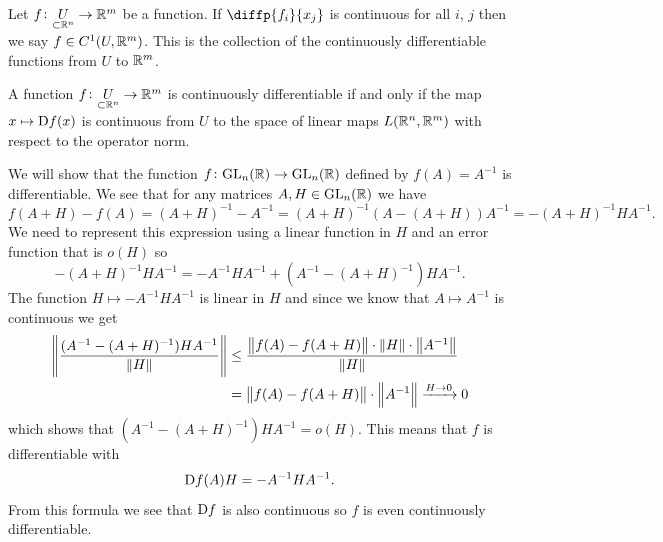 \documentclass[11pt,a4paper]{article}
\begin{document}
\begin{remark}
  Let $f \colon \underset{\subset \mathbb{R}^n}{U} \to \mathbb{R}^m$ be a function.
  If $\diffp{f_i}{{x_j}}$ is continuous for all $i$, $j$ then we say
  $f \in C^1(U,\mathbb{R}^m)$.
  This is the collection of the continuously differentiable functions from
  $U$ to $\mathbb{R}^m$.
\end{remark}
\begin{remark}
  A function $f \colon \underset{\subset \mathbb{R}^n}{U} \to \mathbb{R}^m$ is continuously
  differentiable if and only if the map $x \mapsto \mathrm{D} f(x)$ is continuous
  from $U$ to the space of linear maps $L(\mathbb{R}^n,\mathbb{R}^m)$ with respect to the
  operator norm.
\end{remark}
\begin{example}
  We will show that the function $f \colon \mathrm{GL}_n(\mathbb{R}) \to \mathrm{GL}_n(\mathbb{R})$ defined
  by $f(A) = A^{-1}$ is differentiable.
  We see that for any matrices $A, H \in \mathrm{GL}_n(\mathbb{R})$ we have
  \[
    f(A + H) - f(A) =
    (A + H)^{-1} - A^{-1} =
    (A + H)^{-1} (A - (A + H)) A^{-1} =
    - (A + H)^{-1} H A^{-1}.
  \]
  We need to represent this expression using a linear function in $H$ and
  an error function that is $o(H)$ so
  \[
    - (A + H)^{-1} H A^{-1} =
    - A^{-1} H A^{-1} + (A^{-1} - (A + H)^{-1}) H A^{-1}.
  \]
  The function $H \mapsto - A^{-1} H A^{-1}$ is linear in $H$ and
  since we know that $A \mapsto A^{-1}$ is continuous we get
  \begin{align*}
    \left\lVert\frac{(A^{-1} - (A + H)^{-1}) H A^{-1}}{\left\lVert H\right\rVert}\right\rVert &\le
    \frac{\left\lVert f(A) - f(A + H)\right\rVert \cdot \left\lVert H\right\rVert \cdot 
    \left\lVert A^{-1}\right\rVert}{\left\lVert H\right\rVert} \\ &=
    \left\lVert f(A) - f(A + H)\right\rVert \cdot \left\lVert A^{-1}\right\rVert \xrightarrow{H \to 0} 0
  \end{align*}
  which shows that $(A^{-1} - (A + H)^{-1}) H A^{-1} = o(H)$.
  This means that $f$ is differentiable with
  \[
    \mathrm{D} f(A)H = - A^{-1} H A^{-1}.
  \]
  From this formula we see that $\mathrm{D} f$ is also continuous so $f$ is
  even continuously differentiable.
\end{example}
\end{document}
